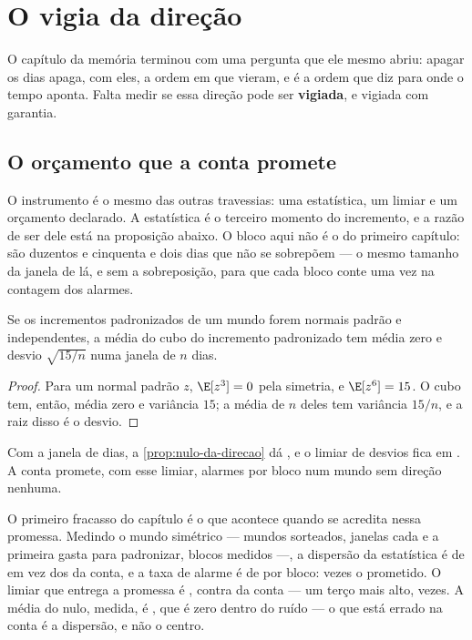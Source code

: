 \chapter{O vigia da direção}\label{cap:direcao}

O capítulo da memória terminou com uma pergunta que ele mesmo abriu: apagar os dias apaga, com eles,
a ordem em que vieram, e é a ordem que diz para onde o tempo aponta. Falta medir se essa direção pode
ser \textbf{vigiada}, e vigiada com garantia.

\section{O orçamento que a conta promete}

O instrumento é o mesmo das outras travessias: uma estatística, um limiar e um orçamento declarado. A
estatística é o terceiro momento do incremento, e a razão de ser dele está na proposição abaixo. O bloco aqui não é o do
primeiro capítulo: são duzentos e cinquenta e dois dias que não se sobrepõem --- o mesmo tamanho da janela de lá, e sem
a sobreposição, para que cada bloco conte uma vez na contagem dos alarmes.

\begin{proposicao}\label{prop:nulo-da-direcao}
Se os incrementos padronizados de um mundo forem normais padrão e independentes, a média do cubo do
incremento padronizado tem média zero e desvio $\sqrt{15/n}$ numa janela de $n$ dias.
\end{proposicao}

\begin{proof}
Para um normal padrão $z$, $\E[z^3] = 0$ pela simetria, e $\E[z^6] = 15$. O cubo tem, então, média
zero e variância $15$; a média de $n$ deles tem variância $15/n$, e a raiz disso é o desvio.
\end{proof}

Com a janela de \numDirecaoJanela{} dias, a \cref{prop:nulo-da-direcao} dá \numDirecaoConta{}, e o limiar de
\numDirecaoZ{} desvios fica em \numDirecaoLimiar{}. A conta promete, com esse limiar,
\numDirecaoContaTaxa{} alarmes por bloco num mundo sem direção nenhuma.

O primeiro fracasso do capítulo é o que acontece quando se acredita nessa promessa. Medindo o mundo
simétrico --- \numDirecaoSementes{} mundos sorteados, \numDirecaoBlocosPorMundo{} janelas cada e a
primeira gasta para padronizar, \numDirecaoBlocosNulo{} blocos medidos ---, a dispersão da
estatística é de \numDirecaoNuloDispersao{} em vez dos \numDirecaoConta{} da conta, e a taxa de
alarme é de \numDirecaoNuloTaxa{} por bloco: \numDirecaoRazaoDasTaxas{} vezes o prometido. O limiar
que entrega a promessa é \numDirecaoLimiarMedido{}, contra \numDirecaoLimiar{} da conta --- um terço mais
alto, \numDirecaoLimiarMedidoRazao{} vezes. A média do nulo, medida, é \numDirecaoNuloMedia{}, que é zero
dentro do ruído --- o que está errado na conta é a dispersão, e não o centro.

